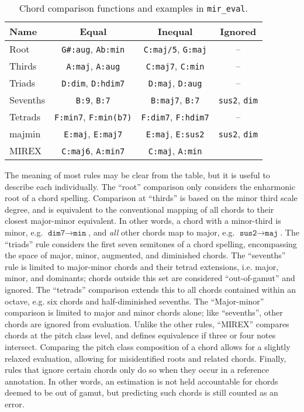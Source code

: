 \begin{table}[t]
\begin{center}
\caption{Chord comparison functions and examples in \texttt{mir\_eval}.}
\label{tab:mir_eval}
\begin{tabular}{l | c | c | c }
Name & Equal & Inequal & Ignored \\
\hline
Root & \texttt{G\#:aug}, \texttt{Ab:min} & \texttt{C:maj/5}, \texttt{G:maj} & -- \\
Thirds & \texttt{A:maj}, \texttt{A:aug} & \texttt{C:maj7}, \texttt{C:min} & --\\
Triads & \texttt{D:dim}, \texttt{D:hdim7} & \texttt{D:maj}, \texttt{D:aug} & -- \\
Sevenths & \texttt{B:9}, \texttt{B:7} & \texttt{B:maj7}, \texttt{B:7} & \texttt{sus2}, \texttt{dim} \\
Tetrads & \texttt{F:min7}, \texttt{F:min(b7)} & \texttt{F:dim7}, \texttt{F:hdim7} & -- \\
majmin & \texttt{E:maj}, \texttt{E:maj7} & \texttt{E:maj}, \texttt{E:sus2} & \texttt{sus2}, \texttt{dim} \\
MIREX & \texttt{C:maj6}, \texttt{A:min7} & \texttt{C:maj}, \texttt{A:min} \\
\hline
\end{tabular}
\end{center}
\end{table}

The meaning of most rules may be clear from the table, but it is useful to describe each individually.
The ``root'' comparison only considers the enharmonic root of a chord spelling.
Comparison at ``thirds'' is based on the minor third scale degree, and is equivalent to the conventional mapping of all chords to their closest major-minor equivalent.
In other words, a chord with a minor-third is minor, e.g. $\texttt{dim7} \to \texttt{min}$, and \emph{all} other chords map to major, e.g. $\texttt{sus2} \to \texttt{maj}$.
The ``triads'' rule considers the first seven semitones of a chord spelling, encompassing the space of major, minor, augmented, and diminished chords.
The ``sevenths'' rule is limited to major-minor chords and their tetrad extensions, i.e. major, minor, and dominants;
chords outside this set are considered ``out-of-gamut'' and ignored.
The ``tetrads'' comparison extends this to all chords contained within an octave, e.g. six chords and half-diminished sevenths.
The ``Major-minor'' comparison is limited to major and minor chords alone;
like ``sevenths'', other chords are ignored from evaluation.
Unlike the other rules, ``MIREX'' compares chords at the pitch class level, and defines equivalence if three or four notes intersect.
Comparing the pitch class composition of a chord allows for a slightly relaxed evaluation, allowing for misidentified roots and related chords.
Finally, rules that ignore certain chords only do so when they occur in a reference annotation.
In other words, an estimation is not held accountable for chords deemed to be out of gamut, but predicting such chords is still counted as an error.

